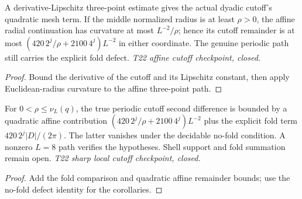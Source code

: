 \begin{lemma}
  \label{lem:normalized-cutoff-affine-remainder}
  \leanok
  A derivative-Lipschitz three-point estimate gives the actual dyadic
  cutoff's quadratic mesh term. If the middle normalized radius is at
  least $\rho>0$, the affine radial continuation has curvature at most
  $L^{-2}/\rho$; hence its cutoff remainder is at most
  $(420\,2^j/\rho+2100\,4^j)L^{-2}$ in either coordinate.
  The genuine periodic path still carries the explicit fold defect.
  \emph{T22 affine cutoff checkpoint, closed.}
\end{lemma}
\begin{proof}\leanok
  Bound the derivative of the cutoff and its Lipschitz constant, then
  apply Euclidean-radius curvature to the affine three-point path.
\end{proof}

\begin{lemma}
  \label{lem:normalized-cutoff-second-diff-sharp}
  \leanok
  For $0<\rho\leq\nu_L(q)$, the true periodic cutoff second difference
  is bounded by a quadratic affine contribution
  $(420\,2^j/\rho+2100\,4^j)L^{-2}$ plus the explicit fold term
  $420\,2^j|D|/(2\pi)$. The latter vanishes under the decidable no-fold
  condition. A nonzero $L=8$ path verifies the hypotheses.
  Shell support and fold summation remain open.
  \emph{T22 sharp local cutoff checkpoint, closed.}
\end{lemma}
\begin{proof}\leanok
  Add the fold comparison and quadratic affine remainder bounds; use
  the no-fold defect identity for the corollaries.
\end{proof}

